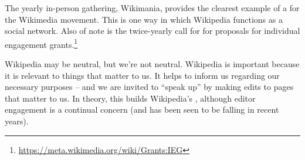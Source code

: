  
The yearly in-person gathering, Wikimania, provides the clearest
example of a  for the Wikimedia movement.  This
is one way in which Wikipedia functions as a social network.  Also of
note is the twice-yearly call for for proposals for individual
engagement
grants.\footnote{\url{https://meta.wikimedia.org/wiki/Grants:IEG}}

%
%
Wikipedia may be neutral, but we're not neutral.
%
%
%
Wikipedia is important because it is relevant to things that matter to
us.  It helps to inform us regarding our necessary purposes -- and we
are invited to ``speak up'' by making edits to pages that matter to
us.  In theory, this builds Wikipedia's , although editor engagement is a continual concern (and
has been seen to be falling in recent years).
%



